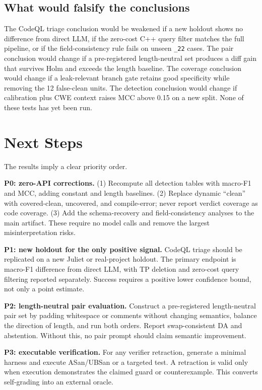 \documentclass[conference]{IEEEtran}
\begin{document}
\subsection{What would falsify the conclusions}

The CodeQL triage conclusion would be weakened if a new holdout shows no difference from direct LLM, if the zero-cost C++ query filter matches the full pipeline, or if the field-consistency rule fails on unseen \texttt{\_22} cases. The pair conclusion would change if a pre-registered length-neutral set produces a diff gain that survives Holm and exceeds the length baseline. The coverage conclusion would change if a leak-relevant branch gate retains good specificity while removing the 12 false-clean units. The detection conclusion would change if calibration plus CWE context raises MCC above 0.15 on a new split. None of these tests has yet been run.

\section{Next Steps}
\label{sec:next}

The results imply a clear priority order.

\textbf{P0: zero-API corrections.}
(1) Recompute all detection tables with macro-F1 and MCC, adding constant and length baselines. (2) Replace dynamic ``clean'' with covered-clean, uncovered, and compile-error; never report verdict coverage as code coverage. (3) Add the schema-recovery and field-consistency analyses to the main artifact. These require no model calls and remove the largest misinterpretation risks.

\textbf{P1: new holdout for the only positive signal.}
CodeQL triage should be replicated on a new Juliet or real-project holdout. The primary endpoint is macro-F1 difference from direct LLM, with TP deletion and zero-cost query filtering reported separately. Success requires a positive lower confidence bound, not only a point estimate.

\textbf{P2: length-neutral pair evaluation.}
Construct a pre-registered length-neutral pair set by padding whitespace or comments without changing semantics, balance the direction of length, and run both orders. Report swap-consistent DA and abstention. Without this, no pair prompt should claim semantic improvement.

\textbf{P3: executable verification.}
For any verifier retraction, generate a minimal harness and execute ASan/UBSan or a targeted test. A retraction is valid only when execution demonstrates the claimed guard or counterexample. This converts self-grading into an external oracle.
\end{document}
